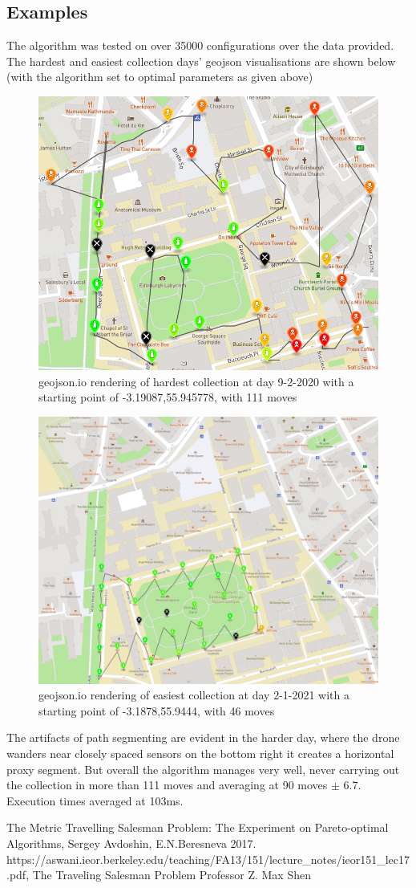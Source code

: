 \documentclass[10pt,a4paper]{article}
\begin{document}
\subsection{Examples}
The algorithm was tested on over 35000 configurations over the data provided. 
The hardest and easiest collection days' geojson visualisations are shown below (with the algorithm set to optimal parameters as given above) 
\begin{figure}[H]
    \centering
    \includegraphics[width=0.6\columnwidth]{diagrams/hard-day.png}
    \caption{geojson.io rendering of hardest collection at day 9-2-2020 with a starting point of -3.19087,55.945778, with 111 moves}
    \label{fig:simulation}
\end{figure}
\begin{figure}[H]
    \centering
    \includegraphics[width=0.6\columnwidth]{diagrams/easy-day.png}
    \caption{geojson.io rendering of easiest collection at day 2-1-2021 with a starting point of -3.1878,55.9444, with 46 moves}
    \label{fig:simulation}
\end{figure}

The artifacts of path segmenting are evident in the harder day, where the drone wanders near closely spaced sensors on the bottom right it creates a horizontal 
proxy segment. But overall the algorithm manages very well, never carrying out the collection in more than 111 moves and averaging at 90 moves $\pm$ 6.7. Execution times averaged at 103ms.
\begin{thebibliography}{9}

The Metric Travelling Salesman Problem:
The Experiment on Pareto-optimal
Algorithms,
Sergey Avdoshin, E.N.Beresneva
2017.
https://aswani.ieor.berkeley.edu/teaching/FA13/151/lecture\_notes/ieor151\_lec17.pdf,
The Traveling Salesman Problem
Professor Z. Max Shen

\end{thebibliography}
\end{document}
